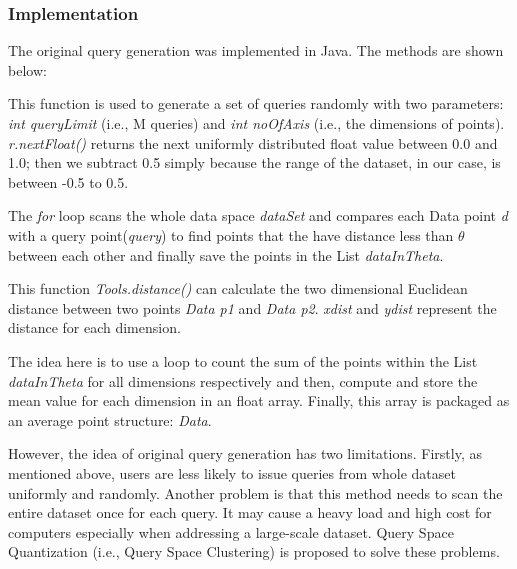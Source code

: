 \documentclass{lmproj}
\begin{document}
\subsubsection{Implementation}
The original query generation was implemented in Java. The methods are shown below:



This function is used to generate a set of queries randomly with two parameters: \textit{int queryLimit} (i.e., M queries) and \textit{int noOfAxis} (i.e., the dimensions of points). \textit{r.nextFloat()} returns the next uniformly distributed float value between 0.0 and 1.0; then we subtract 0.5 simply because the range of the dataset, in our case, is between -0.5 to 0.5.


The \textit{for} loop scans the whole data space \textit{dataSet} and compares each Data point \textit{d} with a query point(\textit{query}) to find points that the have distance less than $ \theta $ between each other and finally save the points in the List \textit{dataInTheta}. 

This function \textit{Tools.distance()} can calculate the two dimensional Euclidean distance between two points \textit{Data p1} and \textit{Data p2}. \textit{xdist} and \textit{ydist} represent the distance for each dimension.

The idea here is to use a loop to count the sum of the points within the List \textit{dataInTheta} for all dimensions respectively and then, compute and store the mean value for each dimension in an float array. Finally, this array is packaged as an average point structure: \textit{Data}. 

However, the idea of original query generation has two limitations. Firstly, as mentioned above, users are less likely to issue queries from whole dataset uniformly and randomly. Another problem is that this method needs to scan the entire dataset once for each query. It may cause a heavy load and high cost for computers especially when addressing a large-scale dataset. Query Space Quantization (i.e., Query Space Clustering) is proposed to solve these problems. 
\end{document}
